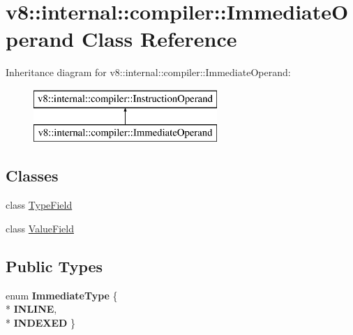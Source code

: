 \hypertarget{classv8_1_1internal_1_1compiler_1_1_immediate_operand}{}\section{v8\+:\+:internal\+:\+:compiler\+:\+:Immediate\+Operand Class Reference}
\label{classv8_1_1internal_1_1compiler_1_1_immediate_operand}
Inheritance diagram for v8\+:\+:internal\+:\+:compiler\+:\+:Immediate\+Operand\+:\begin{figure}[H]
\begin{center}
\leavevmode
\includegraphics[height=2.000000cm]{classv8_1_1internal_1_1compiler_1_1_immediate_operand}
\end{center}
\end{figure}
\subsection*{Classes}
\begin{DoxyCompactItemize}
\item 
class \hyperlink{classv8_1_1internal_1_1compiler_1_1_immediate_operand_1_1_type_field}{Type\+Field}
\item 
class \hyperlink{classv8_1_1internal_1_1compiler_1_1_immediate_operand_1_1_value_field}{Value\+Field}
\end{DoxyCompactItemize}
\subsection*{Public Types}
\begin{DoxyCompactItemize}
\item 
enum {\bfseries Immediate\+Type} \{ \\*
{\bfseries I\+N\+L\+I\+NE}, 
\\*
{\bfseries I\+N\+D\+E\+X\+ED}
 \}\hypertarget{classv8_1_1internal_1_1compiler_1_1_immediate_operand_a2eb49a40716bc9e70b13e38b3fd612c3}{}\label{classv8_1_1internal_1_1compiler_1_1_immediate_operand_a2eb49a40716bc9e70b13e38b3fd612c3}

\end{DoxyCompactItemize}

